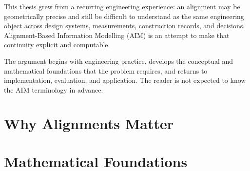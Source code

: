 \documentclass[11pt,a4paper,oneside,openany]{scrbook}
\newif\ifaimGerman
\theoremstyle{plain}
\theoremstyle{definition}
\theoremstyle{remark}
\begin{document}
This thesis grew from a recurring engineering experience: an alignment
may be geometrically precise and still be difficult to understand as the
same engineering object across design systems, measurements, construction
records, and decisions. Alignment-Based Information Modelling (AIM) is an
attempt to make that continuity explicit and computable.

The argument begins with engineering practice, develops the conceptual and
mathematical foundations that the problem requires, and returns to
implementation, evaluation, and application. The reader is not expected to
know the AIM terminology in advance.
\fi


\ifaimGerman
  
  
\else
  
  
\fi



\mainmatter

\ifaimGerman
  \part{Warum Alignments wesentlich sind}
\else
  \part{Why Alignments Matter}
\fi

\ifaimGerman
  
  
  
  
\else
  
  
  
  
\fi

\ifaimGerman
  \part{Mathematische Grundlagen}
\else
  \part{Mathematical Foundations}
\fi
\end{document}
